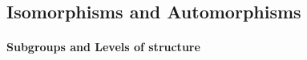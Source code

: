 





\subsection{Isomorphisms and Automorphisms}
\label{sec:isomorphism}

\paragraph{Subgroups and Levels of structure}

